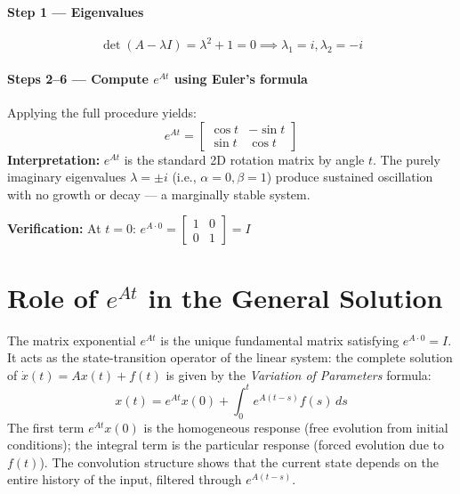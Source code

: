 \documentclass[11pt,a4paper]{article}
\begin{document}
\paragraph{Step 1 --- Eigenvalues}
\begin{equation*}
\det(A - \lambda I) = \lambda^2 + 1 = 0 \implies \lambda_1 = i, \lambda_2 = -i
\end{equation*}

\paragraph{Steps 2--6 --- Compute $e^{At}$ using Euler's formula}
Applying the full procedure yields:
\begin{equation*}
e^{At} = \begin{bmatrix} \cos t & -\sin t \\ \sin t & \cos t \end{bmatrix}
\end{equation*}
\textbf{Interpretation:} $e^{At}$ is the standard 2D rotation matrix by angle $t$. The purely imaginary eigenvalues $\lambda = \pm i$ (i.e., $\alpha = 0, \beta = 1$) produce sustained oscillation with no growth or decay — a marginally stable system.

\textbf{Verification:} At $t = 0$: $e^{A \cdot 0} = \begin{bmatrix} 1 & 0 \\ 0 & 1 \end{bmatrix} = I$ \checkmark

\section{Role of $e^{At}$ in the General Solution}
The matrix exponential $e^{At}$ is the unique fundamental matrix satisfying $e^{A \cdot 0} = I$. It acts as the state-transition operator of the linear system: the complete solution of $\dot{x}(t) = Ax(t) + f(t)$ is given by the \textit{Variation of Parameters} formula:
\begin{equation}
x(t) = e^{At}x(0) + \int_{0}^{t} e^{A(t-s)} f(s) \, ds
\end{equation}
The first term $e^{At}x(0)$ is the homogeneous response (free evolution from initial conditions); the integral term is the particular response (forced evolution due to $f(t)$). The convolution structure shows that the current state depends on the entire history of the input, filtered through $e^{A(t-s)}$.
\end{document}

